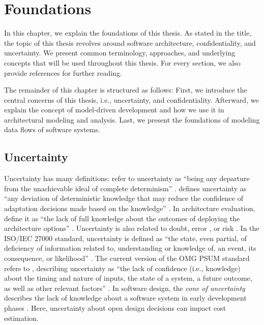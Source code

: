 \chapter{Foundations}%
\label{ch:foundations}%


In this chapter, we explain the foundations of this thesis.
As stated in the title, the topic of this thesis revolves around software architecture, confidentiality, and uncertainty.
We present common terminology, approaches, and underlying concepts that will be used throughout this thesis.
For every section, we also provide references for further reading.

The remainder of this chapter is structured as follows:
First, we introduce the central concerns of this thesis, i.e., uncertainty, and confidentiality.
Afterward, we explain the concept of model-driven development and how we use it in architectural modeling and analysis.
Last, we present the foundations of modeling data flows of software systems.





\section{Uncertainty}%
\label{sec:foundations:uncertainty}

Uncertainty has many definitions:
\textcite{walker_defining_2003} refer to uncertainty as \enquote{being any departure from the unachievable ideal of complete determinism} \cite{walker_defining_2003}.
\textcite{weyns_introduction_2020} defines uncertainty as \enquote{any deviation of deterministic knowledge that may reduce the confidence of adaptation decisions made based on the knowledge} \cite{weyns_introduction_2020}.
In architecture evaluation, \textcite{sobhy_evaluation_2021} define it as \enquote{the lack of full knowledge about the outcomes of deploying the architecture options} \cite{sobhy_evaluation_2021}.
Uncertainty is also related to doubt, error \cite{jcgm_1002008_evaluation_2008}, or risk \cite{international_organization_for_standardization_isoiec_2018}.
In the ISO/IEC 27000 standard, uncertainty is defined as \enquote{the state, even partial, of deficiency of information related to, understanding or knowledge of, an event, its consequence, or likelihood} \cite{international_organization_for_standardization_isoiec_2018}.
The current version of the \acf{OMG} \acf{PSUM} standard refers to \textcite{zhang_understanding_2016}, describing uncertainty as \enquote{the lack of confidence (i.e., knowledge) about the timing and nature of inputs, the state of a system, a future outcome, as well as other relevant factors} \cite{PSUM}.
In software design, the \emph{cone of uncertainty} describes the lack of knowledge about a software system in early development phases \cite{mcconnell_software_1998}.
Here, uncertainty about open design decisions can impact cost estimation.

